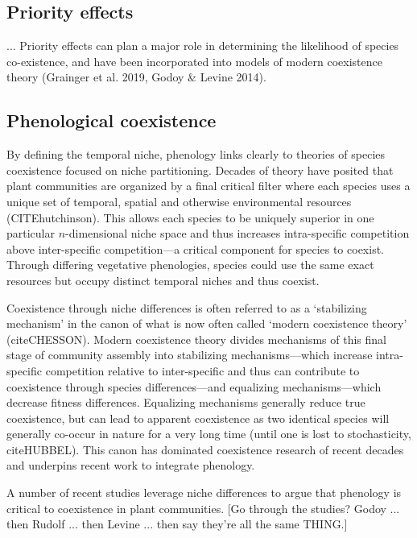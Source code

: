 \documentclass[11pt]{article}
\begin{document}
\subsection*{Priority effects}


...
Priority effects can plan a major role in determining the likelihood of species co-existence, and have been incorporated into models of modern coexistence theory (Grainger et al. 2019, Godoy \& Levine 2014).

\subsection*{Phenological coexistence}

By defining the temporal niche, phenology links clearly to theories of species coexistence focused on niche partitioning. Decades of theory have posited that plant communities are organized by a final critical filter where each species uses a unique set of temporal, spatial and otherwise environmental resources (CITEhutchinson). This allows each species to be uniquely superior in one particular $n$-dimensional niche space and thus increases intra-specific competition above inter-specific competition---a critical component for species to coexist. Through differing vegetative phenologies, species could use the same exact resources but occupy distinct temporal niches and thus coexist. 

Coexistence through niche differences is often referred to as a `stabilizing mechanism' in the canon of what is now often called `modern coexistence theory' (citeCHESSON). Modern coexistence theory divides mechanisms of this final stage of community assembly into stabilizing mechanisms---which increase intra-specific competition relative to inter-specific and thus can contribute to coexistence through species differences---and equalizing mechanisms---which decrease fitness differences. Equalizing mechanisms generally reduce true coexistence, but can lead to apparent coexistence as two identical species will generally co-occur in nature for a very long time (until one is lost to stochasticity, citeHUBBEL). This canon has dominated coexistence research of recent decades and underpins recent work to integrate phenology.

A number of recent studies leverage niche differences to argue that phenology is critical to coexistence in plant communities. [Go through the studies? Godoy ... then Rudolf ... then Levine ... then say they're all the same THING.]
\end{document}
